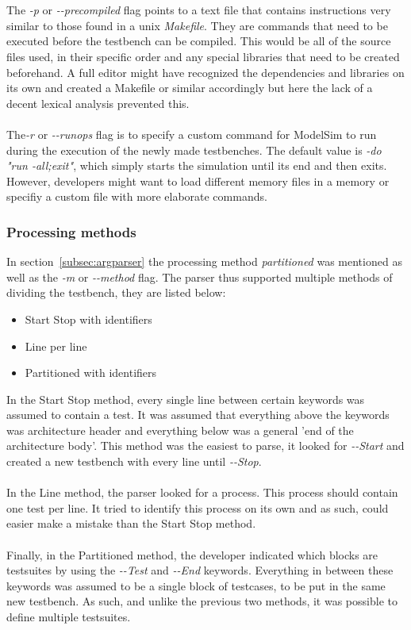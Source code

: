 \documentclass[11pt,british]{article}
\begin{document}
\\
\\
The \emph{-p} or \emph{-\--precompiled} flag points to a text file that contains instructions very similar to those found in a unix \emph{Makefile}. They are commands that need to be executed before the testbench can be compiled. This would be all of the source files used, in their specific order and any special libraries that need to be created beforehand. A full editor might have recognized the dependencies and libraries on its own and created a Makefile or similar accordingly but here the lack of a decent lexical analysis prevented this.
\\
\\
The\emph{-r} or \emph{-\--runops} flag is to specify a custom command for ModelSim to run during the execution of the newly made testbenches. The default value is \emph{-do "run -all;exit"}, which simply starts the simulation until its end and then exits. However, developers might want to load different memory files in a memory or specifiy a custom file with more elaborate commands.

\subsubsection{Processing methods}
\label{subsubsec:processmethods}
In section~\ref{subsec:argparser} the processing method \emph{partitioned} was mentioned as well as the \emph{-m} or \emph{-\--method} flag. The parser thus supported multiple methods of dividing the testbench, they are listed below:
\begin{itemize}%
\item Start Stop with identifiers
\item Line per line 
\item Partitioned with identifiers
\end{itemize}
In the Start Stop method, every single line between certain keywords was assumed to contain a test. It was assumed that everything above the keywords was architecture header and everything below was a general 'end of the architecture body'. This method was the easiest to parse, it looked for \emph{-\--Start} and created a new testbench with every line until \emph{-\--Stop}.
\\
\\
In the Line method, the parser looked for a process. This process should contain one test per line. It tried to identify this process on its own and as such, could easier make a mistake than the Start Stop method.
\\
\\
Finally, in the Partitioned method, the developer indicated which blocks are testsuites by using the \emph{-\--Test} and \emph{-\--End} keywords. Everything in between these keywords was assumed to be a single block of testcases, to be put in the same new testbench. As such, and unlike the previous two methods, it was possible to define multiple testsuites. 
\end{document}
